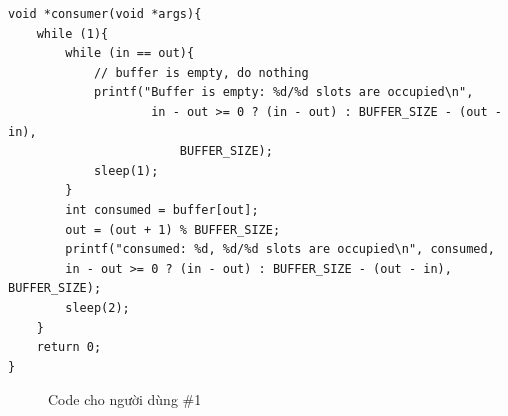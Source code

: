 \documentclass{article}
\begin{document}
\begin{shaded}
    \begin{lstlisting}
void *consumer(void *args){
    while (1){
        while (in == out){
            // buffer is empty, do nothing
            printf("Buffer is empty: %d/%d slots are occupied\n",
                    in - out >= 0 ? (in - out) : BUFFER_SIZE - (out - in), 
                        BUFFER_SIZE);
            sleep(1);
        }
        int consumed = buffer[out];
        out = (out + 1) % BUFFER_SIZE;
        printf("consumed: %d, %d/%d slots are occupied\n", consumed, 
        in - out >= 0 ? (in - out) : BUFFER_SIZE - (out - in), BUFFER_SIZE);
        sleep(2);
    }
    return 0;
}
    \end{lstlisting}
\end{shaded}

\begin{figure}[h]
    \centering
    \caption{Code cho người dùng \#1}
\end{figure}

\pagebreak
\end{document}
